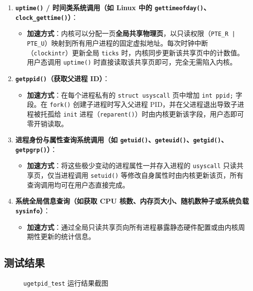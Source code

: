 \documentclass[12pt, a4paper]{ctexart}
\begin{document}
\begin{enumerate}
    \item \textbf{\texttt{uptime()} / 时间类系统调用（如 Linux 中的 \texttt{gettimeofday()}、\texttt{clock\_gettime()}）}：
    \begin{itemize}
        \item \textbf{加速方式}：内核可以分配一页\textbf{全局共享物理页}，以只读权限（\texttt{PTE\_R | PTE\_U}）映射到所有用户进程的固定虚拟地址。每次时钟中断（\texttt{clockintr}）更新全局 \texttt{ticks} 时，内核同步更新该共享页中的计数值。用户态调用 \texttt{uptime()} 时直接读取该共享页即可，完全无需陷入内核。
    \end{itemize}
    \item \textbf{\texttt{getppid()}（获取父进程 ID）}：
    \begin{itemize}
        \item \textbf{加速方式}：在每个进程私有的 \texttt{struct usyscall} 页中增加 \texttt{int ppid;} 字段。在 \texttt{fork()} 创建子进程时写入父进程 PID，并在父进程退出导致子进程被托孤给 \texttt{init} 进程（\texttt{reparent()}）时由内核更新该字段，用户态即可零开销读取。
    \end{itemize}
    \item \textbf{进程身份与属性查询系统调用（如 \texttt{getuid()}、\texttt{geteuid()}、\texttt{getgid()}、\texttt{getpgrp()}）}：
    \begin{itemize}
        \item \textbf{加速方式}：将这些极少变动的进程属性一并存入进程的 \texttt{usyscall} 只读共享页，仅当进程调用 \texttt{setuid()} 等修改自身属性时由内核更新该页，所有查询调用均可在用户态直接完成。
    \end{itemize}
    \item \textbf{系统全局信息查询（如获取 CPU 核数、内存页大小、随机数种子或系统负载 \texttt{sysinfo}）}：
    \begin{itemize}
        \item \textbf{加速方式}：通过全局只读共享页向所有进程暴露静态硬件配置或由内核周期性更新的统计信息。
    \end{itemize}
\end{enumerate}

\subsection{测试结果}
\begin{figure}[H]
    \centering
    \caption{\texttt{ugetpid\_test} 运行结果截图}
    \label{fig:ugetpid_test}
\end{figure}
\end{document}
